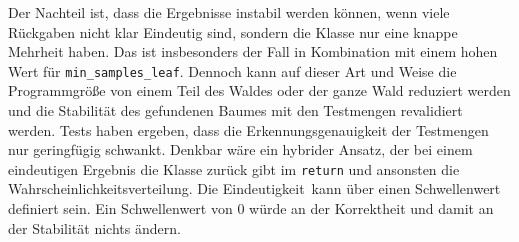 \newline
Der Nachteil ist, dass die Ergebnisse instabil werden können, wenn viele Rückgaben nicht klar Eindeutig sind, sondern die Klasse nur eine knappe Mehrheit haben. Das ist insbesonders der Fall in
Kombination mit einem hohen Wert für \texttt{min\_samples\_leaf}. Dennoch kann auf dieser Art und Weise die Programmgröße von einem Teil des Waldes oder der ganze Wald reduziert werden und die
Stabilität des gefundenen Baumes mit den Testmengen revalidiert werden. Tests haben ergeben, dass die Erkennungsgenauigkeit der Testmengen nur geringfügig schwankt.
\newline
\newline
Denkbar wäre ein hybrider Ansatz, der bei einem eindeutigen Ergebnis die Klasse zurück gibt im \texttt{return} und ansonsten die Wahrscheinlichkeitsverteilung. Die \glqq Eindeutigkeit\grqq\ kann über
einen Schwellenwert definiert sein. Ein Schwellenwert von $0$ würde an der Korrektheit und damit an der Stabilität nichts ändern.